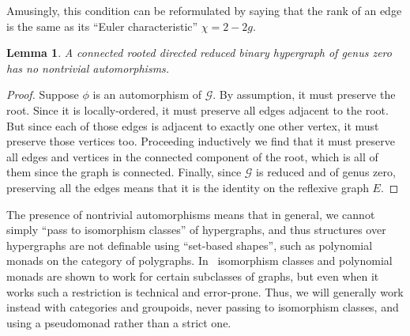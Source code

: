 \documentclass{article}
\newtheorem{lem}[thm]{Lemma}
\theoremstyle{definition}
\newtheorem{defn}[thm]{Definition}
\theoremstyle{remark}
\def\G{\mathcal{G}}
\begin{document}
Amusingly, this condition can be reformulated by saying that the rank of an edge is the same as its ``Euler characteristic'' $\chi=2-2g$.

\begin{lem}
  A connected rooted directed reduced binary hypergraph of genus zero has no nontrivial automorphisms.
\end{lem}
\begin{proof}
  Suppose $\phi$ is an automorphism of $\G$.
  By assumption, it must preserve the root.
  Since it is locally-ordered, it must preserve all edges adjacent to the root.
  But since each of those edges is adjacent to exactly one other vertex, it must preserve those vertices too.
  Proceeding inductively we find that it must preserve all edges and vertices in the connected component of the root, which is all of them since the graph is connected.
  Finally, since $\G$ is reduced and of genus zero, preserving all the edges means that it is the identity on the reflexive graph $E$.
\end{proof}

The presence of nontrivial automorphisms means that in general, we cannot simply ``pass to isomorphism classes'' of hypergraphs, and thus structures over hypergraphs are not definable using ``set-based shapes'', such as polynomial monads on the category of polygraphs.
In~\cite{bb:htapm} isomorphism classes and polynomial monads are shown to work for certain subclasses of graphs, but even when it works such a restriction is technical and error-prone.
Thus, we will generally work instead with categories and groupoids, never passing to isomorphism classes, and using a pseudomonad rather than a strict one.


\end{document}

